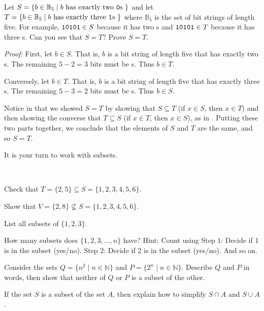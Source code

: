 \begin{exam}
\label{exam_proof_sets_equal}    
    Let $S = \{ b \in \mathbb{B}_5 \mid b \text{ has exactly two \texttt{0}s } \}$ and let $T = \{ b \in \mathbb{B}_5 \mid b \text{ has exactly three \texttt{1}s } \}$ where $\mathbb{B}_5$ is the set of bit strings of length five.  For example, $\texttt{10101} \in S$ because it has two s and $\texttt{10101} \in T$ because it has three s. Can you see that $S = T$?  Prove $S=T$. 
        \begin{soln}
            \emph{Proof:} First, let $b \in S$.  That is, $b$ is a bit string of length five that has exactly two s.  The remaining $5-2=3$ bits must be s. Thus $b \in T$.  
            
            Conversely, let $b \in T$.  That is, $b$ is a bit string of length five that has exactly three s.  The remaining $5-3=2$ bits must be s.  Thus $b \in S$.
        \end{soln}
\end{exam}

Notice in  that we showed $S=T$ by showing that $S \subseteq T$ (if $x \in S$, then $x \in T$) and then showing the converse that $T \subseteq S$ (if $x \in T$, then $x \in S$), as in .
Putting these two parts together, we conclude that the elements of $S$ and $T$ are the same, and so $S=T$.

It is your turn to work with subsets.

\begin{act}[Subsets]
\label{act_subsets}
~
    \begin{actpart}
        \item Check that $T=\{2,5\} \subseteq S=\{1,2,3,4,5,6\}$.
        \item Show that $V = \{2,8\} \not \subseteq S=\{1,2,3,4,5,6\}$.
        \item List all subsets of $\{1,2,3\}$. 
        \item \label{part_number_subsets_n} How many subsets does $\{1,2,3,\ldots,n\}$ have? Hint: Count using Step 1: Decide if 1 is in the subset (yes/no). Step 2: Decide if 2 is in the subset (yes/no). And so on.
        \item Consider the sets $Q = \{ n^2 \mid n \in \mathbb{N}\}$ and $P = \{2^n \mid n \in \mathbb{N}\}$.  Describe $Q$ and $P$ in words, then show that neither of $Q$ or $P$ is a subset of the other.
        \item If the set $S$ is a subset of the set $A$, then explain how to simplify $S \cap A$ and $S \cup A$.
    \end{actpart}
\end{act}

